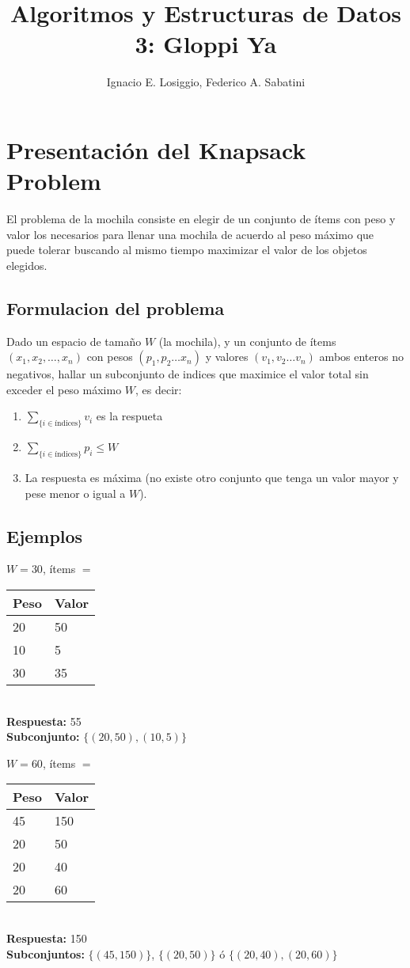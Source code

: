 \documentclass[fleqn, 11pt]{article}
\title{Algoritmos y Estructuras de Datos 3: Gloppi Ya}
\author{Ignacio E. Losiggio, Federico A. Sabatini}
\begin{document}
\maketitle

\tableofcontents

\section{Presentación del Knapsack Problem}

El problema de la mochila consiste en elegir de un conjunto de ítems con peso y
valor los necesarios para llenar una mochila de acuerdo al peso máximo que
puede tolerar buscando al mismo tiempo maximizar el valor de los objetos
elegidos.

\subsection{Formulacion del problema}

Dado un espacio de tamaño $W$ (la mochila), y un conjunto de ítems $(x_1, x_2,
\dots, x_n)$ con pesos $(p_1, p_2 \dots x_n)$ y valores $(v_1, v_2 \dots v_n)$
ambos enteros no negativos, hallar un subconjunto de indices que maximice el
valor total sin exceder el peso máximo $W$, es decir:

\begin{enumerate}
	\item $\sum_{\{i \in \text{índices}\}} v_i$ es la respueta
	\item $\sum_{\{i \in \text{índices}\}} p_i \le W$
	\item La respuesta es máxima (no existe otro conjunto que tenga un
	valor mayor y  pese menor o igual a $W$).
\end{enumerate}

\subsection{Ejemplos}

$W = 30$, ítems $=$
\begin{tabular}{l l}
	Peso  & Valor \\ \toprule
	20 & 50 \\
	10 & 5  \\
	30 & 35
\end{tabular} \\
\textbf{Respuesta:} 55 \\
\textbf{Subconjunto:} $\{(20,50), (10,5)\}$

$W = 60$, ítems $=$
\begin{tabular}{l l}
	Peso & Valor \\ \toprule
	45 & 150 \\
	20 & 50 \\
	20 & 40 \\
	20 & 60
\end{tabular} \\
\textbf{Respuesta:} 150 \\
\textbf{Subconjuntos:} $\{(45, 150)\}$, $\{(20, 50)\}$ ó $\{(20, 40), (20,
60)\}$
\end{document}
